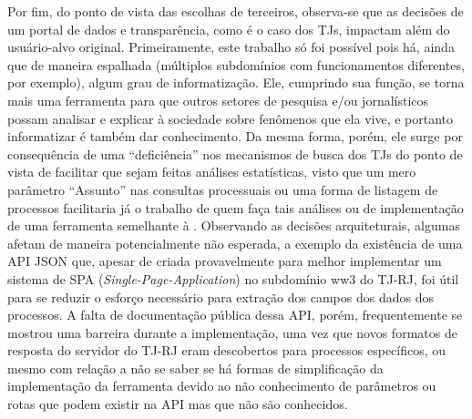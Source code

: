 Por fim, do ponto de vista das escolhas de terceiros, observa-se que as
decisões de um portal de dados e transparência, como é o caso dos TJs, impactam
além do usuário-alvo original. Primeiramente, este trabalho só foi possível
pois há, ainda que de maneira espalhada (múltiplos subdomínios com
funcionamentos diferentes, por exemplo), algum grau de informatização. Ele,
cumprindo sua função, se torna mais uma ferramenta para que outros setores de
pesquisa e/ou jornalísticos possam analisar e explicar à sociedade sobre
fenômenos que ela vive, e portanto informatizar é também dar conhecimento. Da
mesma forma, porém, ele surge por consequência de uma ``deficiência'' nos
mecanismos de busca dos TJs do ponto de vista de facilitar que sejam feitas
análises estatísticas, visto que um mero parâmetro ``Assunto'' nas consultas
processuais ou uma forma de listagem de processos facilitaria já o trabalho de
quem faça tais análises ou de implementação de uma ferramenta semelhante à
\tjscraper. Observando as decisões arquiteturais, algumas afetam de maneira
potencialmente não esperada, a exemplo da existência de uma API JSON que,
apesar de criada provavelmente para melhor implementar um sistema de SPA
(\textit{Single-Page-Application}) no subdomínio ww3 do TJ-RJ, foi útil para se
reduzir o esforço necessário para extração dos campos dos dados dos processos.
A falta de documentação pública dessa API, porém, frequentemente se mostrou uma
barreira durante a implementação, uma vez que novos formatos de resposta do
servidor do TJ-RJ eram descobertos para processos específicos, ou mesmo com
relação a não se saber se há formas de simplificação da implementação da
ferramenta devido ao não conhecimento de parâmetros ou rotas que podem existir
na API mas que não são conhecidos.
